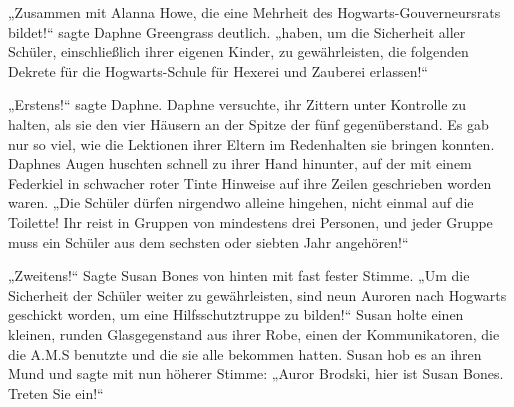 „Zusammen mit Alanna Howe, die eine Mehrheit des Hogwarts-Gouverneursrats bildet!“ sagte Daphne Greengrass deutlich. „haben, um die Sicherheit aller Schüler, einschließlich ihrer eigenen Kinder, zu gewährleisten, die folgenden Dekrete für die Hogwarts-Schule für Hexerei und Zauberei erlassen!“

\later

„Erstens!“ sagte Daphne. Daphne versuchte, ihr Zittern unter Kontrolle zu halten, als sie den vier Häusern an der Spitze der fünf gegenüberstand. Es gab nur so viel, wie die Lektionen ihrer Eltern im Redenhalten sie bringen konnten. Daphnes Augen huschten schnell zu ihrer Hand hinunter, auf der mit einem Federkiel in schwacher roter Tinte Hinweise auf ihre Zeilen geschrieben worden waren.
„Die Schüler dürfen nirgendwo alleine hingehen, nicht einmal auf die Toilette! Ihr reist in Gruppen von mindestens drei Personen, und jeder Gruppe muss ein Schüler aus dem sechsten oder siebten Jahr angehören!“

„Zweitens!“ Sagte Susan Bones von hinten mit fast fester Stimme. „Um die Sicherheit der Schüler weiter zu gewährleisten, sind neun Auroren nach Hogwarts geschickt worden, um eine Hilfsschutztruppe zu bilden!“
Susan holte einen kleinen, runden Glasgegenstand aus ihrer Robe, einen der Kommunikatoren, die die A.M.S benutzte und die sie alle bekommen hatten. Susan hob es an ihren Mund und sagte mit nun höherer Stimme: „Auror Brodski, hier ist Susan Bones. Treten Sie ein!“

